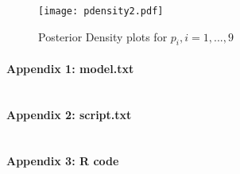 \documentclass[12pt, leqno]{article}
\begin{document}
\begin{figure}
\begin{center}
  \texttt{[image: pdensity2.pdf]}
\end{center}
\caption{Posterior Density plots for $p_i, i = 1, ..., 9$} 
\label{density2}
\end{figure} 

 
\pagebreak

\paragraph{Appendix 1: model.txt}
\begin{verbatim}

\end{verbatim}

\paragraph{Appendix 2: script.txt}
\begin{verbatim}

\end{verbatim}

\paragraph{Appendix 3: R code}

\begin{verbatim}

\end{verbatim}
\end{document}
